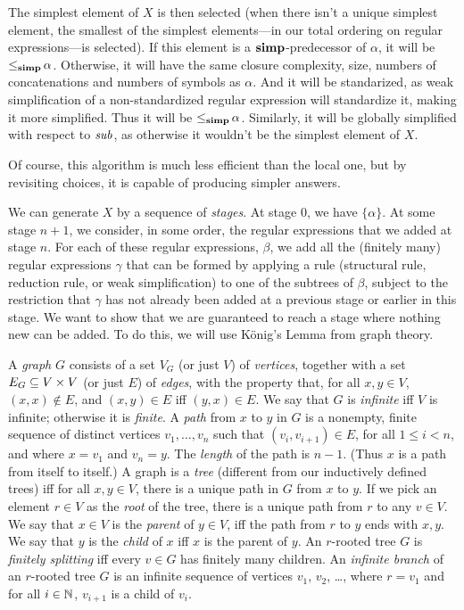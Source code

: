The simplest element of $X$ is then selected (when there isn't a
unique simplest element, the smallest of the simplest elements---in
our total ordering on regular expressions---is selected).  If this
element is a $\mathrel{\mathbf{simp}}$-predecessor of $\alpha$, it will be
${\mathrel{\leq_{\mathbf{simp}}}}\,\alpha$. Otherwise, it will have the same closure
complexity, size, numbers of concatenations and numbers of symbols as
$\alpha$. And it will be standarized, as weak simplification of a
non-standardized regular expression will standardize it, making it
more simplified. Thus it will be ${\mathrel{\leq_{\mathbf{simp}}}}\,\alpha$.  Similarly, it
will be globally simplified with respect to ${\it sub}$, as otherwise it
wouldn't be the simplest element of $X$.

Of course, this algorithm is much less efficient than the local one,
but by revisiting choices, it is capable of producing simpler answers.

We can generate $X$ by a sequence of \emph{stages}. At stage $0$, we
have $\{\alpha\}$. At some stage $n+1$, we consider, in some order,
the regular expressions that we added at stage $n$. For each of these
regular expressions, $\beta$, we add all the (finitely many) regular
expressions $\gamma$ that can be formed by applying a rule (structural
rule, reduction rule, or weak simplification) to one of the subtrees
of $\beta$, subject to the restriction that $\gamma$ has not already
been added at a previous stage or earlier in this stage.  We want to
show that we are guaranteed to reach a stage where nothing new can be
added. To do this, we will use K\"onig's Lemma
%
from graph theory.

A \emph{graph} $G$ consists of a set $V_G$ (or just $V$) of
\emph{vertices}, together with a set $E_G\subseteq V\times V$ (or just $E$) of
\emph{edges}, with the property that, for all $x, y\in V$,
$(x, x)\not\in E$, and $(x,y)\in E$ iff $(y, x)\in E$.  We say that
$G$ is \emph{infinite} iff $V$ is infinite; otherwise it is
\emph{finite}.  A \emph{path} from $x$ to $y$ in $G$ is a nonempty,
finite sequence of distinct vertices $v_1,\ldots,v_n$ such that
$(v_i, v_{i + 1})\in E$, for all $1\leq i < n$, and where $x = v_1$
and $v_n = y$. The \emph{length} of the path is $n-1$.  (Thus $x$ is a
path from itself to itself.) A graph is a \emph{tree} (different from
our inductively defined trees) iff for all $x,y\in V$, there is a
unique path in $G$ from $x$ to $y$. If we pick an element $r\in V$ as
the \emph{root} of the tree, there is a unique path from $r$ to any
$v\in V$. We say that $x\in V$ is the \emph{parent} of $y\in V$, iff
the path from $r$ to $y$ ends with $x, y$. We say that $y$ is the
\emph{child} of $x$ iff $x$ is the parent of $y$.  An $r$-rooted tree
$G$ is \emph{finitely splitting} iff every $v\in G$ has finitely many
children.  An \emph{infinite branch} of an $r$-rooted tree $G$ is an
infinite sequence of vertices $v_1$, $v_2$, \ldots, where $r = v_1$
and for all $i\in\mathbb{N}$, $v_{i+1}$ is a child of $v_i$.


